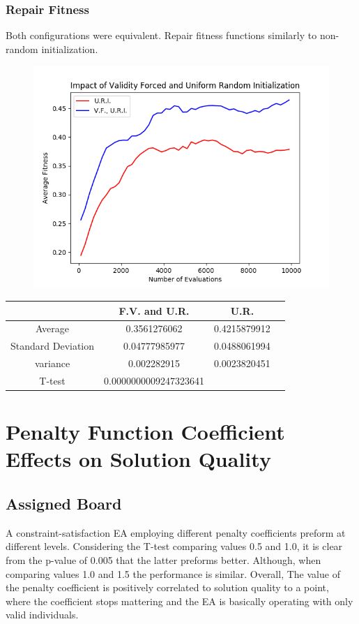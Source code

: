 \documentclass{article}
\begin{document}
		\subsubsection{Repair Fitness}
			Both configurations were equivalent. Repair fitness functions similarly to non-random
			initialization.
			\begin{figure}[!htb]
			\centering
			\includegraphics[scale=0.4]{q2_random_board_repair_ur_vs_vfur.png}
			\end{figure}
			\begin{center}
			\begin{tabular}{ || c | c | c | c ||}
			\hline
			       & F.V. and U.R. & U.R.\\ 
			 \hline\hline
			 Average & 0.3561276062 &	0.4215879912 \\ 
			 \hline
			 Standard Deviation &	0.04777985977 &	0.0488061994\\
			 \hline
			 variance &	0.002282915 &	0.0023820451 \\
			 \hline
			 T-test &	0.0000000009247323641		& \\
			 \hline
			\end{tabular}
			\end{center}


\section{Penalty Function Coefficient Effects on Solution Quality}
	\subsection{Assigned Board}
		A constraint-satisfaction EA employing different penalty coefficients preform at different levels. Considering the T-test comparing values 0.5 and 1.0, it is clear from the p-value of 0.005 that the latter preforms better. Although, when comparing values 1.0 and 1.5 the performance is similar. Overall, The value of the penalty 		coefficient is positively correlated to solution quality to a point, where the coefficient stops mattering and the EA is basically operating with only valid individuals.
		
\end{document}
